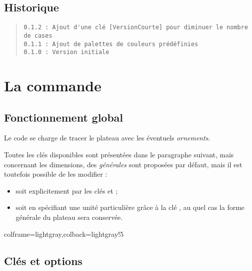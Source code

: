 \documentclass[11pt,a4paper]{ltxdoc}
\begin{document}
\vfill

\subsection{Historique}

\begin{quote}
\begin{verbatim}
0.1.2 : Ajout d'une clé [VersionCourte] pour diminuer le nombre de cases
0.1.1 : Ajout de palettes de couleurs prédéfinies
0.1.0 : Version initiale
\end{verbatim}
\end{quote}

\pagebreak

\section{La commande}

\subsection{Fonctionnement global}

Le code se charge de tracer le plateau avec les éventuels \textit{ornements}.

Toutes les clés disponibles sont présentées dans le paragraphe suivant, mais concernant les dimensions, des \textit{générales} sont proposées par défaut, mais il est toutefois possible de les modifier :

\begin{itemize}
	\item soit explicitement par les clés \MontreCode{[Rayon=]} et \MontreCode{[HauteurCases=]} ;
	\item soit en spécifiant une unité particulière grâce à la clé \MontreCode{[Unite=]}, au quel cas la forme générale du plateau sera conservée.
\end{itemize}

\begin{tcblisting}{colframe=lightgray,colback=lightgray!5}
\PlateauTrivialPursuit[Unite=0.5]
%
\PlateauTrivialPursuit[Rayon=4,HauteurCases=1.25] %

\PlateauTrivialPursuit[Unite=0.33]
%
\PlateauTrivialPursuit[Unite=0.33,VersionCourte]
\end{tcblisting}

\pagebreak

\subsection{Clés et options}
\end{document}
